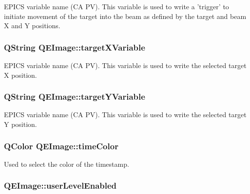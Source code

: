\label{classQEImage_afa8ff630ef168bfa3db1c496f0957497}
EPICS variable name (CA PV). This variable is used to write a 'trigger' to initiate movement of the target into the beam as defined by the target and beam X and Y positions. \hypertarget{classQEImage_a39f8ca186452b20bbc5c3a379fbc302a}{
\subsubsection[{targetXVariable}]{\setlength{\rightskip}{0pt plus 5cm}QString QEImage::targetXVariable}}
\label{classQEImage_a39f8ca186452b20bbc5c3a379fbc302a}
EPICS variable name (CA PV). This variable is used to write the selected target X position. \hypertarget{classQEImage_af4dfc361d50d15cc517b099e33b3f288}{
\subsubsection[{targetYVariable}]{\setlength{\rightskip}{0pt plus 5cm}QString QEImage::targetYVariable}}
\label{classQEImage_af4dfc361d50d15cc517b099e33b3f288}
EPICS variable name (CA PV). This variable is used to write the selected target Y position. \hypertarget{classQEImage_a8ee7300a0ecea621cd6c7196e36cab3f}{
\subsubsection[{timeColor}]{\setlength{\rightskip}{0pt plus 5cm}QColor QEImage::timeColor}}
\label{classQEImage_a8ee7300a0ecea621cd6c7196e36cab3f}
Used to select the color of the timestamp. \hypertarget{classQEImage_a25b8ba9d335dce7a4fd1eb9de3c62446}{
\subsubsection[{userLevelEnabled}]{ QEImage::userLevelEnabled}}
